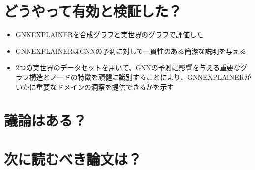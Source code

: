 \documentclass[a4paper,10pt]{ltjsarticle}
\newcommand{\1}{\mbox{1}\hspace{-0.25em}\mbox{l}}
\theoremstyle{definition}
\begin{document}
    \section{どうやって有効と検証した？}
    \begin{itemize}
        \item GNNEXPLAINERを合成グラフと実世界のグラフで評価した
        \item GNNEXPLAINERはGNNの予測に対して一貫性のある簡潔な説明を与える
        \item 2つの実世界のデータセットを用いて、GNNの予測に影響を与える重要なグラフ構造とノードの特徴を頑健に識別することにより、GNNEXPLAINERがいかに重要なドメインの洞察を提供できるかを示す
    \end{itemize}


    \section{議論はある？}


    \section{次に読むべき論文は？}


    
    
\end{document}

